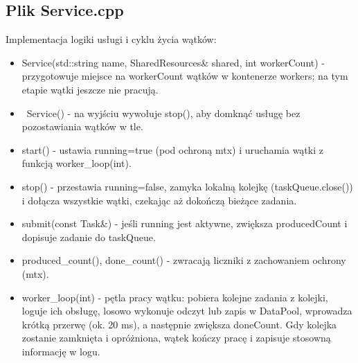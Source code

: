 \documentclass[a4paper,12pt]{article}
\begin{document}
        \subsection{Plik Service.cpp}
            \vspace{-0.2em}
            Implementacja logiki usługi i cyklu życia wątków:
            \begin{itemize}
                \item Service(std::string name, SharedResources\& shared, int workerCount) - przygotowuje miejsce na workerCount wątków w kontenerze workers; na tym etapie wątki jeszcze nie pracują.
                \item ~Service() - na wyjściu wywołuje stop(), aby domknąć usługę bez pozostawiania wątków w tle.
                \item start() - ustawia running=true (pod ochroną mtx) i uruchamia wątki z funkcją worker\_loop(int).
                \item stop() - przestawia running=false, zamyka lokalną kolejkę (taskQueue.close()) i dołącza wszystkie wątki, czekając aż dokończą bieżące zadania.
                \item submit(const Task\&) - jeśli running jest aktywne, zwiększa producedCount i dopisuje zadanie do taskQueue.
                \item produced\_count(), done\_count() - zwracają liczniki z zachowaniem ochrony (mtx).
                \item worker\_loop(int) - pętla pracy wątku: pobiera kolejne zadania z kolejki, loguje ich obsługę, losowo wykonuje odczyt lub zapis w DataPool, wprowadza krótką przerwę (ok. 20 ms), a następnie zwiększa doneCount. Gdy kolejka zostanie zamknięta i opróżniona, wątek kończy pracę i zapisuje stosowną informację w logu.
            \end{itemize}
            \vspace{1em}
\end{document}
